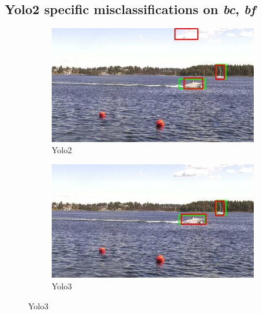 \subsection{Yolo2 specific misclassifications on \textit{bc}, \textit{bf}}
\label{sec:yolo2_spec_misc}
\begin{figure}[h!]
\begin{subfigure}{.5\textwidth}
  \centering
  \includegraphics[width=0.9\linewidth]{results/case_buildings/yolo23/grove/yolo2/selected_06_25_frame0357.jpg}
  \caption{Yolo2}
\end{subfigure}%
\begin{subfigure}{.5\textwidth}
  \centering
  \includegraphics[width=.9\linewidth]{results/case_buildings/yolo23/grove/yolo3/selected_06_25_frame0357.jpg}
  \caption{Yolo3}
\end{subfigure}


\end{figure}

